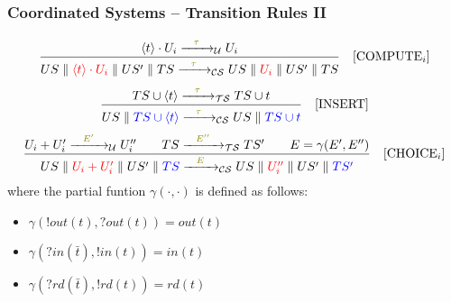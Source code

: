 \documentclass[presentation]{beamer}\mode<presentation>{\usetheme{AMSCesenaPurpleAndGold}}
\begin{document}
\begin{frame}
\frametitle{Coordinated Systems -- Transition Rules II}
	\[
		\frac{
			\langle t \rangle \cdot U_i \xrightarrow{\highlightG{\phantom{ab}\tau\phantom{ab}}}_\mathcal{U} U_i 
		}{
			US \parallel \highlightR{\langle t \rangle \cdot U_i} \parallel US' \parallel TS
			\xrightarrow{\highlightG{\phantom{ab}\tau\phantom{ab}}}_\mathcal{CS}
			US \parallel \highlightR{U_i} \parallel US' \parallel TS
		} 
		\quad 
		[\text{COMPUTE}_i]
	\]
	\vfill
	\[
		\frac{
			TS \cup \langle t \rangle \xrightarrow{\highlightG{\phantom{ab}\tau\phantom{ab}}}_\mathcal{TS} TS \cup t
		}{
			US \parallel \highlightB{TS \cup \langle t \rangle}
			\xrightarrow{\highlightG{\phantom{ab}\tau\phantom{ab}}}_\mathcal{CS}
			US \parallel \highlightB{TS \cup t}
		} 
		\quad 
		[\text{INSERT}]
	\]
	\vfill
	\[
		\frac{
			U_i + U'_i \xrightarrow{\highlightG{\phantom{ab}E'\phantom{ab}}}_\mathcal{U} U''_i 
			\qquad
			TS \xrightarrow{\highlightG{\phantom{ab}E''\phantom{ab}}}_\mathcal{TS} TS'
			\qquad
			E = \gamma(E', E'')
		}{
			US \parallel \highlightR{U_i + U'_i} \parallel US' \parallel \highlightB{TS}
			\xrightarrow{\highlightG{\phantom{ab}E\phantom{ab}}}_\mathcal{CS}
			US \parallel \highlightR{U''_i} \parallel US' \parallel \highlightB{TS'}
		} 
		\quad 
		[\text{CHOICE}_i]
	\]
	where the partial funtion $\gamma(\cdot, \cdot)$ is defined as follows:
	\begin{multicols}{2}\begin{itemize}
			\item $\gamma(!out(t), ?out(t)) = out(t)$
			\item $\gamma(?in(\bar t), !in(t)) = in(t)$
			\item $\gamma(?rd(\bar t), !rd(t)) = rd(t)$
	\end{itemize}\end{multicols}
\end{frame}
\end{document}
